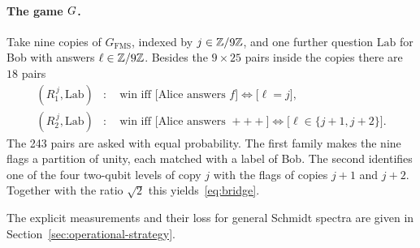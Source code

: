 \paragraph{The game $G$.} Take nine copies of $G_{\mathrm{FMS}}$, indexed by $j\in\mathbb{Z}/9\mathbb{Z}$,
and one further question $\mathrm{Lab}$ for Bob with answers $\ell\in\mathbb{Z}/9\mathbb{Z}$. Besides the
$9\times25$ pairs inside the copies there are $18$ pairs
\begin{align*}
(R_1^{\,j},\mathrm{Lab})&:\quad\text{win iff }\bigl[\text{Alice answers } f\bigr]\Leftrightarrow\bigl[\ell=j\bigr],\\
(R_2^{\,j},\mathrm{Lab})&:\quad\text{win iff }\bigl[\text{Alice answers } {+}{+}{+}\bigr]\Leftrightarrow\bigl[\ell\in\{j+1,j+2\}\bigr].
\end{align*}
The 243 pairs are asked with equal probability. The first family makes the nine flags a
partition of unity, each matched with a label of Bob. The second identifies one of the four
two-qubit levels of copy $j$ with the flags of copies $j+1$ and $j+2$. Together with the ratio
$\sqrt2$ this yields~\eqref{eq:bridge}.


The explicit measurements and their loss for general Schmidt spectra are given in Section~\ref{sec:operational-strategy}.
